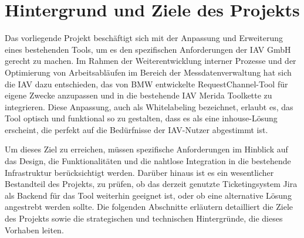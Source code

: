 \chapter{Hintergrund und Ziele des Projekts}
\label{chap:grundlagen}
Das vorliegende Projekt beschäftigt sich mit der Anpassung und Erweiterung eines bestehenden Tools, um es den spezifischen Anforderungen der IAV GmbH gerecht zu machen. Im Rahmen der Weiterentwicklung interner Prozesse und der Optimierung von Arbeitsabläufen im Bereich der Messdatenverwaltung hat sich die IAV dazu entschieden, das von BMW entwickelte RequestChannel-Tool für eigene Zwecke anzupassen und in die bestehende IAV Merida Toolkette zu integrieren. Diese Anpassung, auch als Whitelabeling bezeichnet, erlaubt es, das Tool optisch und funktional so zu gestalten, dass es als eine inhouse-Lösung erscheint, die perfekt auf die Bedürfnisse der IAV-Nutzer abgestimmt ist.

Um dieses Ziel zu erreichen, müssen spezifische Anforderungen im Hinblick auf das Design, die Funktionalitäten und die nahtlose Integration in die bestehende Infrastruktur berücksichtigt werden. Darüber hinaus ist es ein wesentlicher Bestandteil des Projekts, zu prüfen, ob das derzeit genutzte Ticketingsystem Jira als Backend für das Tool weiterhin geeignet ist, oder ob eine alternative Lösung angestrebt werden sollte. Die folgenden Abschnitte erläutern detailliert die Ziele des Projekts sowie die strategischen und technischen Hintergründe, die dieses Vorhaben leiten.
